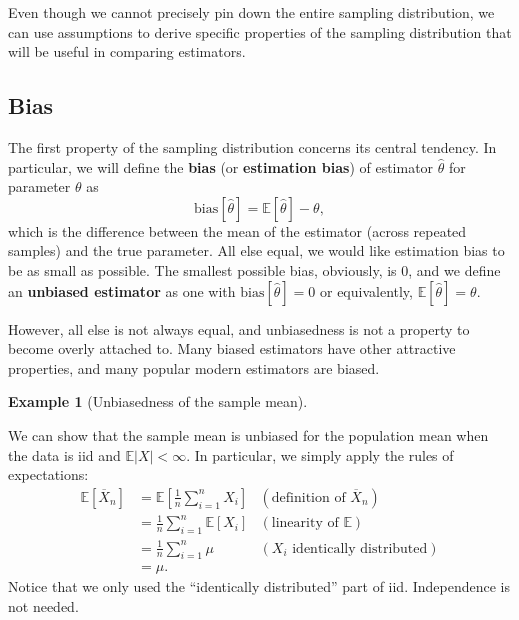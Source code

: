 \documentclass[
  letterpaper,
  DIV=11,
  numbers=noendperiod]{scrreprt}
\newcommand{\E}{\mathbb{E}}
\newcommand{\Xbar}{\overline{X}}
\theoremstyle{definition}
\theoremstyle{plain}
\theoremstyle{definition}
\newtheorem{example}{Example}[chapter]
\theoremstyle{remark}
\begin{document}
Even though we cannot precisely pin down the entire sampling
distribution, we can use assumptions to derive specific properties of
the sampling distribution that will be useful in comparing estimators.

\hypertarget{bias}{%
\subsection{Bias}\label{bias}}

The first property of the sampling distribution concerns its central
tendency. In particular, we will define the \textbf{bias} (or
\textbf{estimation bias}) of estimator \(\widehat{\theta}\) for
parameter \(\theta\) as \[
\text{bias}[\widehat{\theta}] = \E[\widehat{\theta}] - \theta,
\] which is the difference between the mean of the estimator (across
repeated samples) and the true parameter. All else equal, we would like
estimation bias to be as small as possible. The smallest possible bias,
obviously, is 0, and we define an \textbf{unbiased estimator} as one
with \(\text{bias}[\widehat{\theta}] = 0\) or equivalently,
\(\E[\widehat{\theta}] = \theta\).

However, all else is not always equal, and unbiasedness is not a
property to become overly attached to. Many biased estimators have other
attractive properties, and many popular modern estimators are biased.

\begin{example}[Unbiasedness of the sample
mean]\protect\hypertarget{exm-mean-unbiased}{}\label{exm-mean-unbiased}

We can show that the sample mean is unbiased for the population mean
when the data is iid and \(\E|X| < \infty\). In particular, we simply
apply the rules of expectations: \[\begin{aligned}
\E\left[ \Xbar_n \right] &= \E\left[\frac{1}{n} \sum_{i=1}^n X_i\right] & (\text{definition of } \Xbar_n) \\
&= \frac{1}{n} \sum_{i=1}^n \E[X_i] & (\text{linearity of } \E)\\
&= \frac{1}{n} \sum_{i=1}^n \mu & (X_i \text{ identically distributed})\\
&= \mu.
\end{aligned}\] Notice that we only used the ``identically distributed''
part of iid. Independence is not needed.

\end{example}
\end{document}
